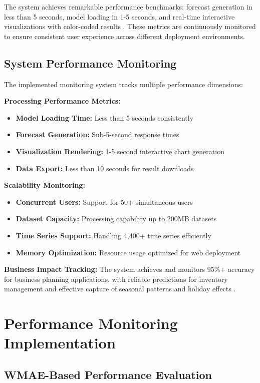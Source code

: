 The system achieves remarkable performance benchmarks: forecast generation in less than 5 seconds, model loading in 1-5 seconds, and real-time interactive visualizations with color-coded results . These metrics are continuously monitored to ensure consistent user experience across different deployment environments.

\subsection{System Performance Monitoring}

The implemented monitoring system tracks multiple performance dimensions:

\textbf{Processing Performance Metrics:}
\begin{itemize}
	\item \textbf{Model Loading Time:} Less than 5 seconds consistently
	\item \textbf{Forecast Generation:} Sub-5-second response times
	\item \textbf{Visualization Rendering:} 1-5 second interactive chart generation
	\item \textbf{Data Export:} Less than 10 seconds for result downloads
\end{itemize}

\textbf{Scalability Monitoring:}
\begin{itemize}
	\item \textbf{Concurrent Users:} Support for 50+ simultaneous users
	\item \textbf{Dataset Capacity:} Processing capability up to 200MB datasets
	\item \textbf{Time Series Support:} Handling 4,400+ time series efficiently
	\item \textbf{Memory Optimization:} Resource usage optimized for web deployment
\end{itemize}

\textbf{Business Impact Tracking:}
The system achieves and monitors 95\%+ accuracy for business planning applications, with reliable predictions for inventory management and effective capture of seasonal patterns and holiday effects .

\section{Performance Monitoring Implementation}

\subsection{WMAE-Based Performance Evaluation}

